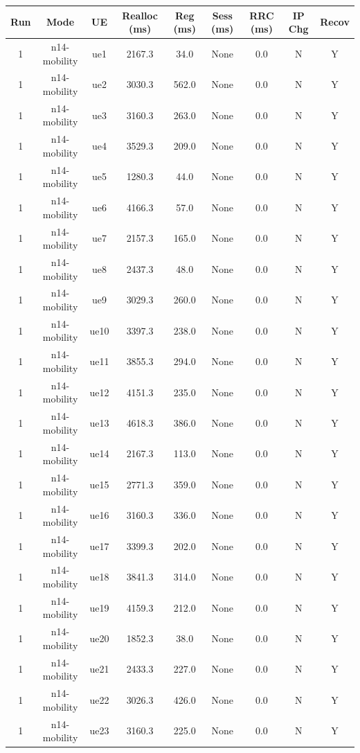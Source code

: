 \begin{table}[ht]
\centering
\begin{tabular}{|c|c|c|c|c|c|c|c|c|}
\hline
Run & Mode & UE & Realloc (ms) & Reg (ms) & Sess (ms) & RRC (ms) & IP Chg & Recov \\
\hline
1 & n14-mobility & ue1 & 2167.3 & 34.0 & None & 0.0 & N & Y \\
1 & n14-mobility & ue2 & 3030.3 & 562.0 & None & 0.0 & N & Y \\
1 & n14-mobility & ue3 & 3160.3 & 263.0 & None & 0.0 & N & Y \\
1 & n14-mobility & ue4 & 3529.3 & 209.0 & None & 0.0 & N & Y \\
1 & n14-mobility & ue5 & 1280.3 & 44.0 & None & 0.0 & N & Y \\
1 & n14-mobility & ue6 & 4166.3 & 57.0 & None & 0.0 & N & Y \\
1 & n14-mobility & ue7 & 2157.3 & 165.0 & None & 0.0 & N & Y \\
1 & n14-mobility & ue8 & 2437.3 & 48.0 & None & 0.0 & N & Y \\
1 & n14-mobility & ue9 & 3029.3 & 260.0 & None & 0.0 & N & Y \\
1 & n14-mobility & ue10 & 3397.3 & 238.0 & None & 0.0 & N & Y \\
1 & n14-mobility & ue11 & 3855.3 & 294.0 & None & 0.0 & N & Y \\
1 & n14-mobility & ue12 & 4151.3 & 235.0 & None & 0.0 & N & Y \\
1 & n14-mobility & ue13 & 4618.3 & 386.0 & None & 0.0 & N & Y \\
1 & n14-mobility & ue14 & 2167.3 & 113.0 & None & 0.0 & N & Y \\
1 & n14-mobility & ue15 & 2771.3 & 359.0 & None & 0.0 & N & Y \\
1 & n14-mobility & ue16 & 3160.3 & 336.0 & None & 0.0 & N & Y \\
1 & n14-mobility & ue17 & 3399.3 & 202.0 & None & 0.0 & N & Y \\
1 & n14-mobility & ue18 & 3841.3 & 314.0 & None & 0.0 & N & Y \\
1 & n14-mobility & ue19 & 4159.3 & 212.0 & None & 0.0 & N & Y \\
1 & n14-mobility & ue20 & 1852.3 & 38.0 & None & 0.0 & N & Y \\
1 & n14-mobility & ue21 & 2433.3 & 227.0 & None & 0.0 & N & Y \\
1 & n14-mobility & ue22 & 3026.3 & 426.0 & None & 0.0 & N & Y \\
1 & n14-mobility & ue23 & 3160.3 & 225.0 & None & 0.0 & N & Y \\

\end{tabular}
\end{table}
